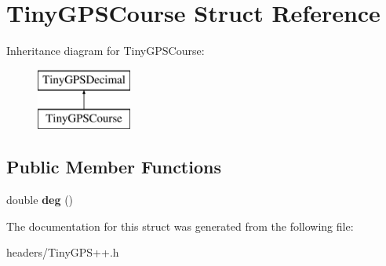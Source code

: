 \section{Tiny\+G\+P\+S\+Course Struct Reference}
\label{struct_tiny_g_p_s_course}
Inheritance diagram for Tiny\+G\+P\+S\+Course\+:\begin{figure}[H]
\begin{center}
\leavevmode
\includegraphics[height=2.000000cm]{struct_tiny_g_p_s_course}
\end{center}
\end{figure}
\subsection*{Public Member Functions}
\begin{DoxyCompactItemize}
\item 
double {\bfseries deg} ()\label{struct_tiny_g_p_s_course_a76dc8ae6c2fe5ead9b44c8d53a3272ca}

\end{DoxyCompactItemize}


The documentation for this struct was generated from the following file\+:\begin{DoxyCompactItemize}
\item 
headers/Tiny\+G\+P\+S++.\+h\end{DoxyCompactItemize}
